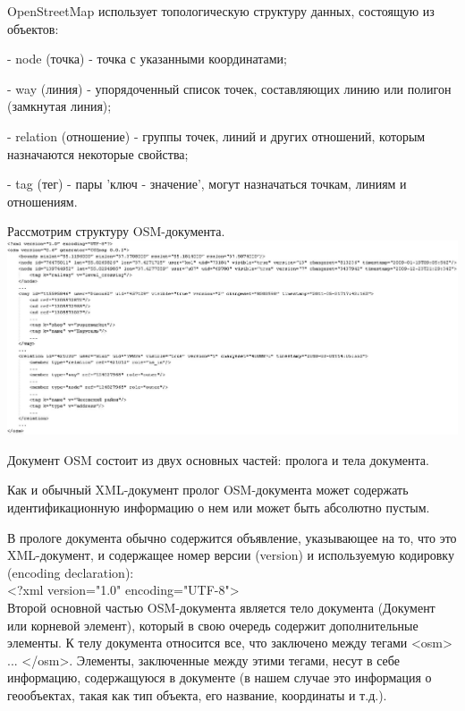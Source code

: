 \documentclass[12pt,a4paper,oneside]{article} %
\begin{document}
OpenStreetMap использует топологическую структуру данных, \linebreak
состоящую из объектов:

- node (точка) - точка с указанными координатами;

- way (линия) - упорядоченный список точек, составляющих линию \linebreak
или полигон (замкнутая линия);

- relation (отношение) - группы точек, линий и других отношений, \linebreak
которым назначаются некоторые свойства;

- tag (тег) - пары 'ключ - значение', могут назначаться точкам, линиям и\linebreak
отношениям.

Рассмотрим структуру OSM-документа.
\\[10pt]
\includegraphics[width=1.1\linewidth]{example_osm}

Документ OSM состоит из двух основных частей: пролога и тела \linebreak
документа.

Как и обычный XML-документ пролог OSM-документа может \linebreak
содержать идентификационную информацию о нем или может быть\linebreak
абсолютно пустым.

В прологе документа обычно содержится объявление, \linebreak
указывающее на то, что это XML-документ, и содержащее номер \linebreak
версии (version) и используемую кодировку (encoding declaration):
\\[10pt]
<?xml version="1.0" encoding="UTF-8">
\\[10pt]
Второй основной частью OSM-документа является тело \linebreak
документа (Документ или корневой элемент), который в свою очередь \linebreak
содержит дополнительные элементы. К телу документа относится все, \linebreak
что заключено между тегами <osm> ... </osm>. Элементы, заключенные \linebreak
между этими тегами, несут в себе информацию, содержащуюся в \linebreak
документе (в нашем случае это информация о геообъектах, такая как\linebreak
тип объекта, его название, координаты и т.д.).
\end{document}
